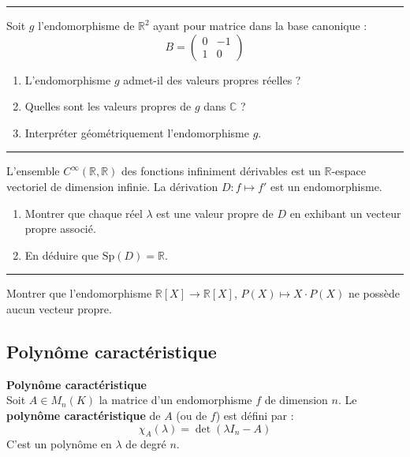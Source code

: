\documentclass[../PolyS4.tex]{subfiles}
\begin{document}
\vspace{1em}
\hrule
\vspace{1em}


Soit $g$ l'endomorphisme de $\mathbb{R}^2$ ayant pour matrice dans la base canonique :
$$B = \begin{pmatrix}
0 & -1 \\
1 & 0
\end{pmatrix}$$
\begin{enumerate}
    \item L'endomorphisme $g$ admet-il des valeurs propres réelles ?
    \item Quelles sont les valeurs propres de $g$ dans $\mathbb{C}$ ?
    \item Interpréter géométriquement l'endomorphisme $g$.
\end{enumerate}

\vspace{1em}
\hrule
\vspace{1em}


L'ensemble $C^\infty(\mathbb{R}, \mathbb{R})$ des fonctions infiniment dérivables est un $\mathbb{R}$-espace vectoriel de dimension infinie. La dérivation $D : f \mapsto f'$ est un endomorphisme.
\begin{enumerate}
    \item Montrer que chaque réel $\lambda$ est une valeur propre de $D$ en exhibant un vecteur propre associé.
    \item En déduire que $\mathrm{Sp}(D) = \mathbb{R}$.
\end{enumerate}

\vspace{1em}
\hrule
\vspace{1em}


Montrer que l'endomorphisme $\mathbb{R}[X] \to \mathbb{R}[X]$, $P(X) \mapsto X \cdot P(X)$ ne possède aucun vecteur propre.

\newpage
\subsection{Polynôme caractéristique}

\begin{Def}\textbf{Polynôme caractéristique}\\

Soit $A \in M_n(K)$ la matrice d'un endomorphisme $f$ de dimension $n$. Le \textbf{polynôme caractéristique} de $A$ (ou de $f$) est défini par :
$$\chi_A(\lambda) = \det(\lambda I_n - A)$$
C'est un polynôme en $\lambda$ de degré $n$.
\end{Def}
\end{document}
